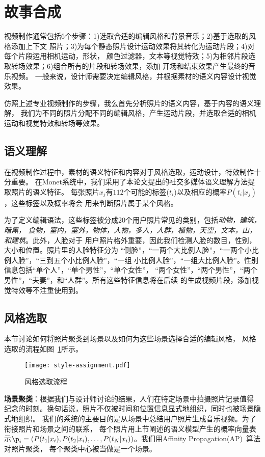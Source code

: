 \section{故事合成}
视频制作通常包括6个步骤：1)选取合适的编辑风格和背景音乐；2)基于选取的风格添加上下文
照片；3)为每个静态照片设计运动效果将其转化为运动片段；4)对每个片段运用相机运动，形状，
颜色过滤器，文本等视觉特效；5)为相邻片段选取转场效果；6)组合所有的片段和转场效果，添加
开场和结束效果产生最终的音乐视频。
一般来说，设计师需要决定编辑风格，并根据素材的语义内容设计视觉效果。

仿照上述专业视频制作的步骤，我么首先分析照片的语义内容，基于内容的语义理解，
我们为不同的照片分配不同的编辑风格，产生运动片段，并选取合适的相机运动和视觉特效和转场等效果。

\subsection{语义理解}
在视频制作过程中，素材的语义特征和内容对于风格选取，运动设计，特效制作十分重要。
在Monet系统中，我们采用了本论文提出的社交多媒体语义理解方法提取照片的语义特征。
每张照片$x_j$有$112$个可能的标签($t_i$)以及相应的概率$P(t_i|x_j)$，这些标签以及概率将会
用来判断照片属于某个风格。

为了定义编辑语法，这些标签被分成$20$个用户照片常见的类别，包括\emph{动物，建筑，暗黑，
食物，室内，室外，物体，人物，多人，人群，植物，天空，文本，山，和建筑}。此外，人脸对于
用户照片格外重要，因此我们检测人脸的数目，性别，大小和位置。照片里的人脸特征分为
``侧脸''，``一两个大比例人脸''，``一两个小比例人脸''，``三到五个小比例人脸''，``一组
小比例人脸''，``一组大比例人脸''。性别信息包括``单个人''，``单个男性''，``单个女性''，
``两个女性''，``两个男性''，``两个男性''，``夫妻''，和``人群''。所有这些特征信息将在后续
的生成视频片段，添加视觉特效等不注重使用到。

\subsection{风格选取}
本节讨论如何将照片聚类到场景以及如何为这些场景选择合适的编辑风格，
风格选取的流程如图~\ref{fig:style-assignment}所示。
\begin{figure}[ht]
    \center
    \texttt{[image: style-assignment.pdf]}
    \caption{风格选取流程}
    \label{fig:style-assignment}
\end{figure}

\textbf{场景聚类}：根据我们与设计师讨论的结果，人们在特定场景中拍摄照片记录值得
纪念的时刻。换句话说，照片不仅被时间和位置信息显式地组织，同时也被场景隐式地组织。
我们的系统的主要目的是从场景中总结用户照片生成音乐视频。为了衔接照片和场景之间的联系，
每个照片用上节阐述的语义模型产生的概率向量表示$\p_i = (P(t_1|x_i), P(t_2|x_i), \ldots,
P(t_N | x_i))$。我们用Affinity Propagation(AP)~\cite{frey2007clustering}算法对照片聚类，
每个聚类中心被当做是一个场景。

